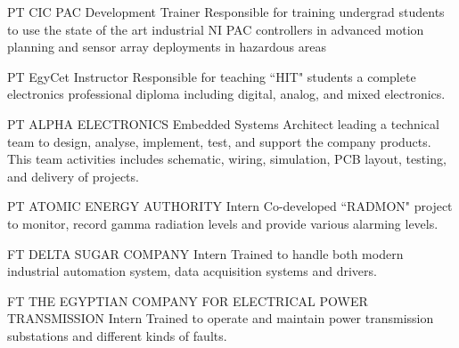 \documentclass[10pt]{article} %
\begin{document}
\begin{paracol}{2}

{PT} %
{CIC} %
{PAC Development Trainer} %
{Responsible for training undergrad students to use the state of the art industrial NI PAC controllers in advanced motion planning and sensor array deployments in hazardous areas}  %


{PT} %
{EgyCet} %
{Instructor} %
{Responsible for teaching ``HIT" students a complete electronics professional diploma including digital, analog, and mixed electronics.} %

{PT} %
{ALPHA ELECTRONICS} %
{Embedded Systems Architect} %
{leading a technical team to design, analyse, implement, test, and support the company products. This team activities includes schematic, wiring, simulation, PCB layout, testing, and delivery of projects.} %

{PT} %
{ATOMIC ENERGY AUTHORITY} %
{Intern} %
{Co-developed ``RADMON" project to monitor, record gamma radiation levels and provide various alarming levels.}

{FT} %
{DELTA SUGAR COMPANY} %
{Intern} %
{Trained to handle both modern industrial automation system, data acquisition systems and drivers.}

{FT} %
{THE EGYPTIAN COMPANY FOR ELECTRICAL POWER TRANSMISSION} %
{Intern} %
{Trained to operate and maintain power transmission substations and different kinds of faults.}


\vspace{-\baselineskip}\medskip %


\end{paracol}
\end{document}
